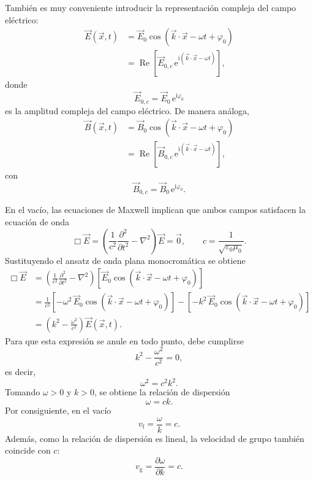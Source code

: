 \documentclass[12pt,a4paper]{article}
\theoremstyle{definition}
\theoremstyle{plain}
\numberwithin{equation}{section}
\theoremstyle{remark}
\newcommand{\ii}{\mathrm{i}}
\newcommand{\ee}{\mathrm{e}}
\newcommand{\E}{\vec{E}}
\newcommand{\B}{\vec{B}}
\newcommand{\epsz}{\varepsilon_0}
\newcommand{\muz}{\mu_0}
\begin{document}
También es muy conveniente introducir la representación compleja del campo eléctrico:
\begin{align*}
    \E(\vec x,t)
    &= \vec E_0 \cos\left(\vec k\cdot\vec x-\omega t+\varphi_0\right) \\
    &= \operatorname{Re}\left[\vec E_{0,c}\,\ee^{\ii\left(\vec k\cdot\vec x-\omega t\right)}\right],
\end{align*}
donde
\begin{equation*}
    \vec E_{0,c}=\vec E_0\,\ee^{\ii\varphi_0}
\end{equation*}
es la amplitud compleja del campo eléctrico. De manera análoga,
\begin{align*}
    \B(\vec x,t)
    &= \vec B_0 \cos\left(\vec k\cdot\vec x-\omega t+\varphi_0\right) \\
    &= \operatorname{Re}\left[\vec B_{0,c}\,\ee^{\ii\left(\vec k\cdot\vec x-\omega t\right)}\right],
\end{align*}
con
\begin{equation*}
    \vec B_{0,c}=\vec B_0\,\ee^{\ii\varphi_0}.
\end{equation*}

En el vacío, las ecuaciones de Maxwell implican que ambos campos satisfacen la ecuación de onda
\begin{equation*}
    \Box \E
    =\left(\frac{1}{c^2}\frac{\partial^2}{\partial t^2}-\nabla^2\right)\E
    =\vec 0,
    \qquad
    c=\frac{1}{\sqrt{\epsz\muz}}.
\end{equation*}
Sustituyendo el ansatz de onda plana monocromática se obtiene
\begin{align*}
    \Box \E
    &=\left(\frac{1}{c^2}\frac{\partial^2}{\partial t^2}-\nabla^2\right)
      \left[\vec E_0\cos\left(\vec k\cdot\vec x-\omega t+\varphi_0\right)\right] \\
    &=\frac{1}{c^2}\left[-\omega^2\,\vec E_0\cos\left(\vec k\cdot\vec x-\omega t+\varphi_0\right)\right]
      -\left[-k^2\,\vec E_0\cos\left(\vec k\cdot\vec x-\omega t+\varphi_0\right)\right] \\
    &=\left(k^2-\frac{\omega^2}{c^2}\right)\E(\vec x,t).
\end{align*}
Para que esta expresión se anule en todo punto, debe cumplirse
\begin{equation*}
    k^2-\frac{\omega^2}{c^2}=0,
\end{equation*}
es decir,
\begin{equation*}
    \omega^2=c^2k^2.
\end{equation*}
Tomando $\omega>0$ y $k>0$, se obtiene la relación de dispersión
\begin{equation*}
    \omega=ck.
\end{equation*}
Por consiguiente, en el vacío
\begin{equation*}
    v_{\mathrm f}=\frac{\omega}{k}=c.
\end{equation*}
Además, como la relación de dispersión es lineal, la velocidad de grupo también coincide con $c$:
\begin{equation*}
    v_{\mathrm g}=\frac{\partial \omega}{\partial k}=c.
\end{equation*}
\end{document}
